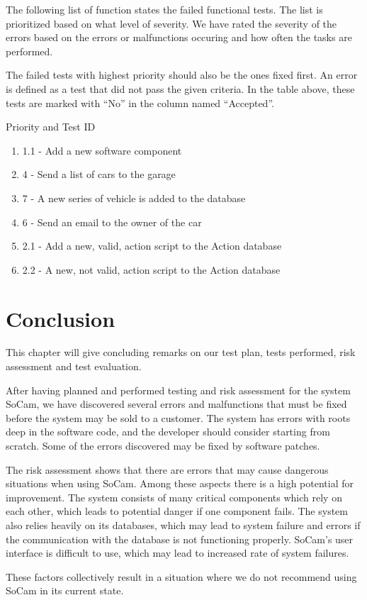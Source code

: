 		The following list of function states the failed functional tests. The list is prioritized based on what level of severity. We have rated the severity of the errors based on the errors or malfunctions occuring and how often the tasks are performed. 

		The failed tests with highest priority should also be the ones fixed first. An error is defined as a test that did not pass the given criteria. In the table above, these tests are marked with “No” in the column named “Accepted”. 

		Priority and Test ID
		\begin{enumerate}
			\item 1.1 - Add a new software component
			\item 4 - Send a list of cars to the garage
			\item 7 - A new series of vehicle is added to the database
			\item 6 - Send an email to the owner of the car
			\item 2.1 - Add a new, valid, action script to the Action database
			\item 2.2 - A new, not valid, action script to the Action database

		\end{enumerate}	


	\section{Conclusion}

		This chapter will give concluding remarks on our test plan, tests performed, risk assessment and test evaluation. 

		After having planned and performed testing and risk assessment for the system SoCam, we have discovered several errors and malfunctions that must be fixed before the system may be sold to a customer. The system has errors with roots deep in the software code, and the developer should consider starting from scratch. Some of the errors discovered may be fixed by software patches. 

		The risk assessment shows that there are errors that may cause dangerous situations when using SoCam. Among these aspects there is a high potential for improvement. The system consists of many critical components which rely on each other, which leads to potential danger if one component fails. The system also relies heavily on its databases, which may lead to system failure and errors if the communication with the database is not functioning properly. SoCam’s user interface is difficult to use, which may lead to increased rate of system failures. 

		These factors collectively result in a situation where we do not recommend using SoCam in its current state.


